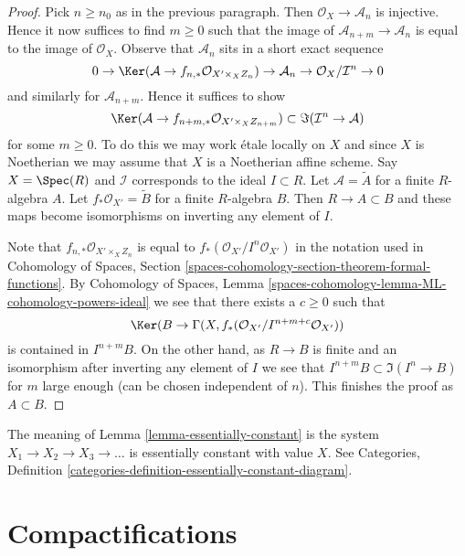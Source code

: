 \begin{proof}
\medskip\noindent
Pick $n \geq n_0$ as in the previous paragraph. Then
$\mathcal{O}_X \to \mathcal{A}_n$ is injective. Hence it now
suffices to find $m \geq 0$ such that the image of
$\mathcal{A}_{n + m} \to \mathcal{A}_n$ is equal
to the image of $\mathcal{O}_X$. Observe that $\mathcal{A}_n$
sits in a short exact sequence
$$
0 \to \Ker(\mathcal{A} \to f_{n, *}\mathcal{O}_{X' \times_X Z_n})
\to \mathcal{A}_n \to \mathcal{O}_X/\mathcal{I}^n \to 0
$$
and similarly for $\mathcal{A}_{n + m}$. Hence it suffices to show
$$
\Ker(\mathcal{A} \to f_{n + m, *}\mathcal{O}_{X' \times_X Z_{n + m}})
\subset
\Im(\mathcal{I}^n \to \mathcal{A})
$$
for some $m \geq 0$. To do this we may work \'etale locally on
$X$ and since $X$ is Noetherian we may assume that $X$ is
a Noetherian affine scheme. Say $X = \Spec(R)$ and $\mathcal{I}$
corresponds to the ideal $I \subset R$. Let $\mathcal{A} = \widetilde{A}$
for a finite $R$-algebra $A$. Let $f_*\mathcal{O}_{X'} = \widetilde{B}$
for a finite $R$-algebra $B$. Then $R \to A \subset B$ and these maps
become isomorphisms on inverting any element of $I$.

\medskip\noindent
Note that $f_{n, *}\mathcal{O}_{X' \times_X Z_n}$
is equal to $f_*(\mathcal{O}_{X'}/I^n\mathcal{O}_{X'})$
in the notation used in Cohomology of Spaces, Section
\ref{spaces-cohomology-section-theorem-formal-functions}.
By Cohomology of Spaces, Lemma
\ref{spaces-cohomology-lemma-ML-cohomology-powers-ideal}
we see that there exists a $c \geq 0$ such that
$$
\Ker(B \to \Gamma(X, f_*(\mathcal{O}_{X'}/I^{n + m + c}\mathcal{O}_{X'}))
$$
is contained in $I^{n + m}B$. On the other hand, as $R \to B$ is
finite and an isomorphism after inverting any element of $I$
we see that $I^{n + m}B \subset \Im(I^n \to B)$ for $m$ large enough
(can be chosen independent of $n$). This finishes the proof as $A \subset B$.
\end{proof}

\begin{remark}
\label{remark-essentially-constant}
The meaning of Lemma \ref{lemma-essentially-constant}
is the system $X_1 \to X_2 \to X_3 \to \ldots$ is essentially
constant with value $X$. See Categories, Definition
\ref{categories-definition-essentially-constant-diagram}.
\end{remark}






\section{Compactifications}
\label{section-compactifications}

